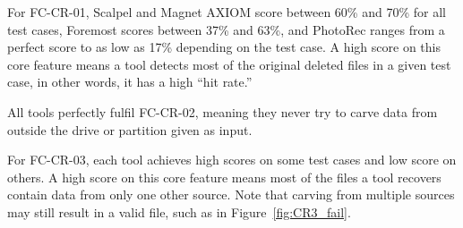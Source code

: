 

For FC-CR-01, Scalpel and Magnet AXIOM score between 60\% and 70\% for all test cases, Foremost scores between 37\% and 63\%, and PhotoRec ranges from a perfect score to as low as 17\% depending on the test case.
A high score on this core feature means a tool detects most of the original deleted files in a given test case, in other words, it has a high ``hit rate.''

All tools perfectly fulfil FC-CR-02, meaning they never try to carve data from outside the drive or partition given as input.

For FC-CR-03, each tool achieves high scores on some test cases and low score on others.
A high score on this core feature means most of the files a tool recovers contain data from only one other source.
Note that carving from multiple sources may still result in a valid file, such as in Figure~\ref{fig:CR3_fail}.

